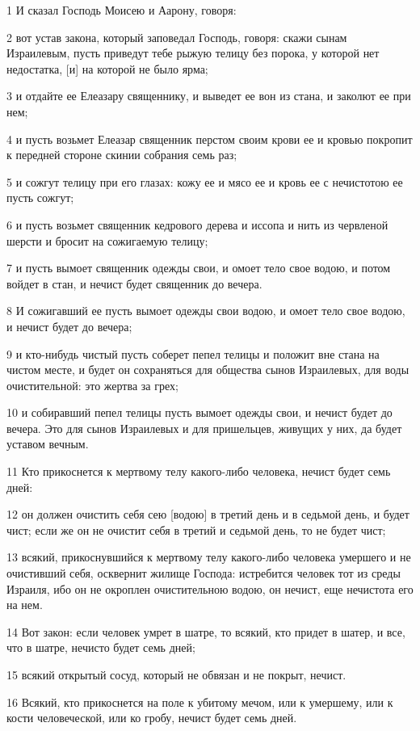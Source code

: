 \par 1 И сказал Господь Моисею и Аарону, говоря:
\par 2 вот устав закона, который заповедал Господь, говоря: скажи сынам Израилевым, пусть приведут тебе рыжую телицу без порока, у которой нет недостатка, [и] на которой не было ярма;
\par 3 и отдайте ее Елеазару священнику, и выведет ее вон из стана, и заколют ее при нем;
\par 4 и пусть возьмет Елеазар священник перстом своим крови ее и кровью покропит к передней стороне скинии собрания семь раз;
\par 5 и сожгут телицу при его глазах: кожу ее и мясо ее и кровь ее с нечистотою ее пусть сожгут;
\par 6 и пусть возьмет священник кедрового дерева и иссопа и нить из червленой шерсти и бросит на сожигаемую телицу;
\par 7 и пусть вымоет священник одежды свои, и омоет тело свое водою, и потом войдет в стан, и нечист будет священник до вечера.
\par 8 И сожигавший ее пусть вымоет одежды свои водою, и омоет тело свое водою, и нечист будет до вечера;
\par 9 и кто-нибудь чистый пусть соберет пепел телицы и положит вне стана на чистом месте, и будет он сохраняться для общества сынов Израилевых, для воды очистительной: это жертва за грех;
\par 10 и собиравший пепел телицы пусть вымоет одежды свои, и нечист будет до вечера. Это для сынов Израилевых и для пришельцев, живущих у них, да будет уставом вечным.
\par 11 Кто прикоснется к мертвому телу какого-либо человека, нечист будет семь дней:
\par 12 он должен очистить себя сею [водою] в третий день и в седьмой день, и будет чист; если же он не очистит себя в третий и седьмой день, то не будет чист;
\par 13 всякий, прикоснувшийся к мертвому телу какого-либо человека умершего и не очистивший себя, осквернит жилище Господа: истребится человек тот из среды Израиля, ибо он не окроплен очистительною водою, он нечист, еще нечистота его на нем.
\par 14 Вот закон: если человек умрет в шатре, то всякий, кто придет в шатер, и все, что в шатре, нечисто будет семь дней;
\par 15 всякий открытый сосуд, который не обвязан и не покрыт, нечист.
\par 16 Всякий, кто прикоснется на поле к убитому мечом, или к умершему, или к кости человеческой, или ко гробу, нечист будет семь дней.
